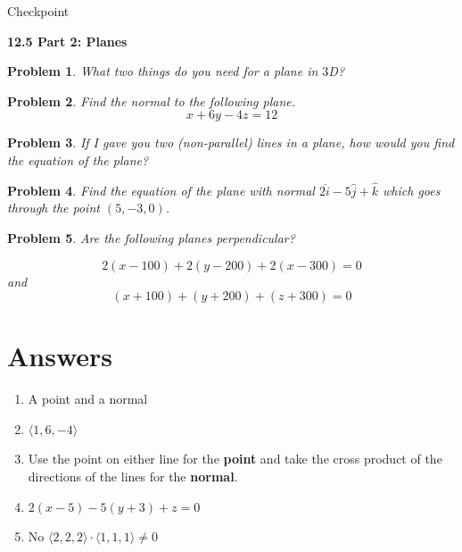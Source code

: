 \documentclass[11pt]{article}
\newtheorem{problem}{Problem}
\newcommand{\vs}{\vspace*{.1in}}
\begin{document}
\begin{huge}
    \begin{center}
        Checkpoint
    \end{center}
\end{huge}
\begin{large}\begin{center}\bf 12.5 Part 2: Planes\end{center}
\end{large}

\vs\vs

\begin{problem}
What two things do you need for a plane in $3$D?  
\end{problem}

\begin{problem}
Find the normal to the following plane. \[x+6y-4z=12\]
\end{problem}

\begin{problem}
If I gave you two (non-parallel) lines in a plane, how would you find the equation of the plane?
\end{problem}


\begin{problem}
Find the equation of the plane with normal $2\hat{i}-5\hat{j}+\hat{k}$ which goes through the point $(5,-3,0)$.
\end{problem}

\begin{problem}
    Are the following planes perpendicular?

    \[2(x-100)+2(y-200)+2(x-300)=0 \] and \[(x+100)+(y+200)+(z+300)=0\]
\end{problem}


\newpage

\section{Answers}

\begin{enumerate}
    \item A point and a normal
    \item $\langle 1,6,-4\rangle$
    \item Use the point on either line for the \textbf{point} and take the cross product of the directions of the lines for the \textbf{normal}.
    \item $2(x-5)-5(y+3)+z=0$
    \item No $\langle 2,2,2 \rangle \cdot \langle 1,1,1 \rangle \neq 0$
\end{enumerate}
\end{document}

